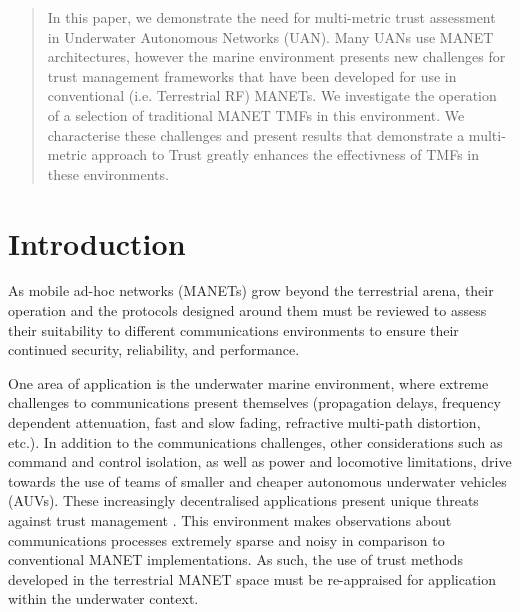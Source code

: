 \documentclass[conference]{IEEEtran}
\begin{document}
\begin{abstract}
In this paper, we demonstrate the need for multi-metric trust assessment in Underwater Autonomous Networks (UAN).
Many UANs use MANET architectures, however the marine environment presents new challenges for trust management frameworks that have been developed for use in conventional (i.e. Terrestrial RF) MANETs.
We investigate the operation of a selection of traditional MANET TMFs in this environment.
We characterise these challenges and present results that demonstrate a multi-metric approach to Trust greatly enhances the effectivness of TMFs in these environments.

\end{abstract}





%
\IEEEpeerreviewmaketitle



\section{Introduction}\label{sec:introduction}

As mobile ad-hoc networks (MANETs) grow beyond the terrestrial arena, their operation and the protocols designed around them must be reviewed to assess their suitability to different communications environments to ensure their continued security, reliability, and performance.

One area of application is the underwater marine environment, where extreme challenges to communications present themselves (propagation delays, frequency dependent attenuation, fast and slow fading, refractive multi-path distortion, etc.).
In addition to the communications challenges, other considerations such as command and control isolation, as well as power and locomotive limitations, drive towards the use of teams of smaller and cheaper autonomous underwater vehicles (AUVs). 
These increasingly decentralised applications present unique threats against trust management \cite{Caiti2011}.
This environment makes observations about communications processes extremely sparse and noisy in comparison to conventional MANET implementations.
As such, the use of trust methods developed in the terrestrial MANET space must be re-appraised for application within the underwater context.
\end{document}
